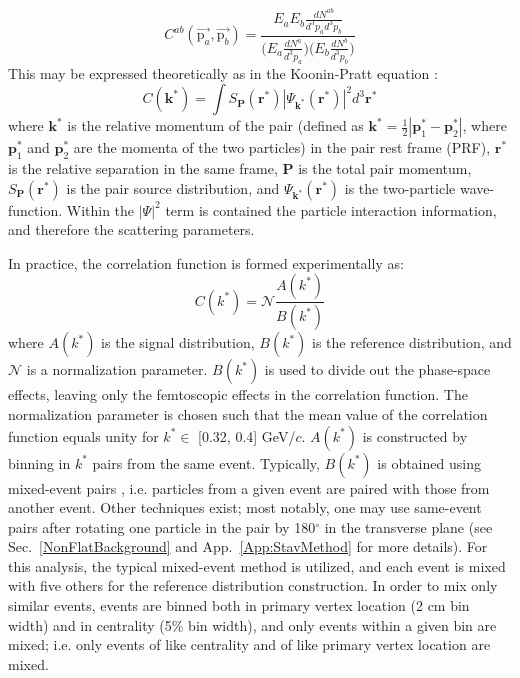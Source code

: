 \documentclass[ALICE,manyauthors]{cernphprep}
\newcommand{\kstar}{$k^{*}$\xspace}
\begin{document}
\begin{equation}
  C^{ab}(\vec{\mathrm{p}_{a}},\vec{\mathrm{p}_{b}}) = \frac{E_{a}E_{b}\frac{dN^{ab}}{d^{3}p_{a}d^{3}p_{b}}}{\big( E_{a}\frac{dN^{a}}{d^{3}p_{a}} \big) \big( E_{b}\frac{dN^{b}}{d^{3}p_{b}} \big)}
\label{eqn:CfRatioSpectra}
\end{equation}
This may be expressed theoretically as in the Koonin-Pratt equation \cite{Koonin:1977fh, Pratt:1990zq}:
\begin{equation}
 C(\mathbf{k^{*}}) = \int S_{\mathbf{P}}(\mathbf{r^{*}})|\Psi_{\mathbf{k^{*}}}(\mathbf{r^{*}})|^{2}d^{3}\mathbf{r^{*}}
\label{eqn:KooninPrattEqn}
\end{equation}
where $\mathbf{k}^{*}$ is the relative momentum of the pair (defined as $\mathbf{k}^{*} = \frac{1}{2}|\mathbf{p}_{1}^{*}-\mathbf{p}_{2}^{*}|$, where $\mathbf{p}_{1}^{*}$ and $\mathbf{p}_{2}^{*}$ are the momenta of the two particles) in the pair rest frame (PRF), $\mathbf{r}^{*}$ is the relative separation in the same frame, $\mathbf{P}$ is the total pair momentum, $S_{\mathbf{P}}(\mathbf{r^{*}})$ is the pair source distribution, and $\Psi_{\mathbf{k^{*}}}(\mathbf{r^{*}})$ is the two-particle wave-function.
Within the $|\Psi|^{2}$ term is contained the particle interaction information, and therefore the scattering parameters.

In practice, the correlation function is formed experimentally as:
\begin{equation}
  C(k^{*}) = \mathcal{N}\frac{A(k^{*})}{B(k^{*})}
\label{eqn:CfExp}
\end{equation}
where $A(k^{*})$ is the signal distribution, $B(k^{*})$ is the reference distribution, and $\mathcal{N}$ is a normalization parameter.  
$B(k^{*})$ is used to divide out the phase-space effects, leaving only the femtoscopic effects in the correlation function. 
The normalization parameter is chosen such that the mean value of the correlation function equals unity for \kstar $\in$ [0.32, 0.4] GeV/$c$.
{\color{red}{In practice, }}$A(k^{*})$ is constructed by binning in \kstar pairs from the same event.
Typically, $B(k^{*})$ is obtained using mixed-event pairs \cite{Kopylov:1974th}, i.e. particles from a given event are paired with those from another event.
Other techniques exist; most notably, one may use same-event pairs after rotating one particle in the pair by 180$^\circ$ in the transverse plane (see Sec.\ \ref{NonFlatBackground} and App.\ \ref{App:StavMethod} for more details).
For this analysis, the typical mixed-event method is utilized, and each event is mixed with five others for the reference distribution construction.
In order to mix only similar events, events are binned both in primary vertex location (2 cm bin width) and in centrality (5\% bin width), and only events within a given bin are mixed; i.e. only events of like centrality and of like primary vertex location are mixed.
\end{document}
